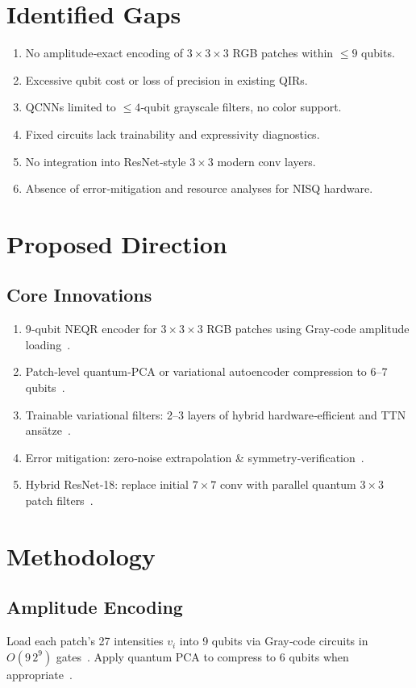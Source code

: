 \documentclass[onecolumn,12pt]{IEEEtran}
\begin{document}
\section{Identified Gaps}
\begin{enumerate}[itemsep=4pt]
  \item No amplitude‐exact encoding of $3\times3\times3$ RGB patches within $\le9$ qubits.
  \item Excessive qubit cost or loss of precision in existing QIRs.
  \item QCNNs limited to $\le4$‐qubit grayscale filters, no color support.
  \item Fixed circuits lack trainability and expressivity diagnostics.
  \item No integration into ResNet‐style $3\times3$ modern conv layers.
  \item Absence of error‐mitigation and resource analyses for NISQ hardware.
\end{enumerate}

\section{Proposed Direction}
\subsection{Core Innovations}
\begin{enumerate}[itemsep=2pt]
  \item 9‐qubit NEQR encoder for $3\times3\times3$ RGB patches using Gray‐code amplitude loading~\cite{plessch2011quantum}.
  \item Patch‐level quantum‐PCA or variational autoencoder compression to 6–7 qubits~\cite{yu2019quantum,romero2017quantum}.
  \item Trainable variational filters: 2–3 layers of hybrid hardware‐efficient and TTN ansätze~\cite{sugisaki2019quantum}.
  \item Error mitigation: zero‐noise extrapolation \& symmetry‐verification~\cite{zhu2022efficient,mcclean2018barren}.
  \item Hybrid ResNet‐18: replace initial $7\times7$ conv with parallel quantum $3\times3$ patch filters~\cite{fan2024hybrid}.
\end{enumerate}

\section{Methodology}
\subsection{Amplitude Encoding}
Load each patch’s 27 intensities $v_i$ into 9 qubits via Gray‐code circuits in $O(9\,2^9)$ gates~\cite{plessch2011quantum}. Apply quantum PCA to compress to 6 qubits when appropriate~\cite{yu2019quantum}.
\end{document}

